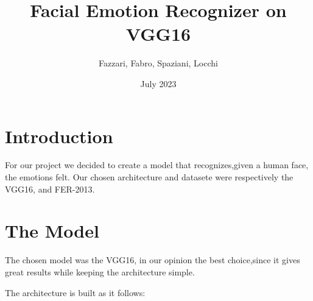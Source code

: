 \documentclass{article}
\title{Facial Emotion Recognizer on VGG16}
\author{Fazzari, Fabro, Spaziani, Locchi }
\date{July 2023}
\begin{document}
\maketitle
\tableofcontents

\newpage
\section{Introduction}

For our project we decided to create a model that recognizes,given a human face, the emotions felt.
Our chosen architecture and datasete were respectively the VGG16, and FER-2013.

\begin{figure}[htbp]
    \centering
    
    \hfill
    \label{fig:introduction_img}
\end{figure}

\newpage
\section{The Model}
The chosen model was the VGG16, in our opinion the best choice,since it gives great results while keeping the architecture simple.

The architecture is built as it follows:
\end{document}
